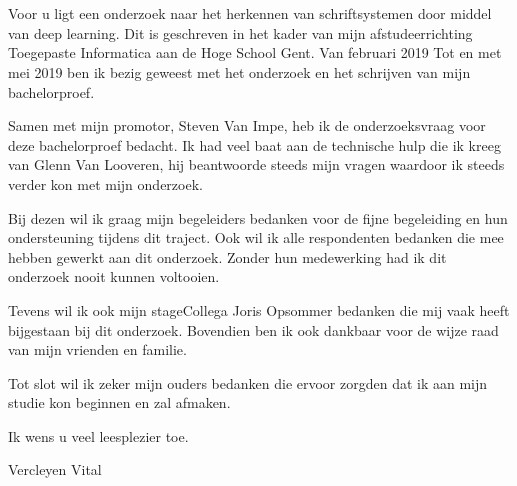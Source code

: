 
\chapter*{}
\label{ch:voorwoord}


Voor u ligt een onderzoek naar het herkennen van schriftsystemen door middel van deep learning.
Dit is geschreven in het kader van mijn afstudeerrichting Toegepaste Informatica aan de Hoge School Gent.
Van februari 2019 Tot en met mei 2019 ben ik bezig geweest met het onderzoek en het schrijven van mijn bachelorproef.

Samen met mijn promotor, Steven Van Impe, heb ik de onderzoeksvraag voor deze bachelorproef bedacht.
Ik had veel baat aan de technische hulp die ik kreeg van Glenn Van Looveren, hij beantwoorde steeds mijn vragen waardoor ik steeds verder kon met mijn onderzoek.

Bij dezen wil ik graag mijn begeleiders bedanken voor de fijne begeleiding en hun ondersteuning tijdens dit traject. Ook wil ik alle respondenten bedanken die mee hebben gewerkt aan dit onderzoek. Zonder hun medewerking had ik dit onderzoek nooit kunnen voltooien.

Tevens wil ik ook mijn stageCollega Joris Opsommer bedanken die mij vaak heeft bijgestaan bij dit onderzoek.
Bovendien ben ik ook dankbaar voor de wijze raad van mijn vrienden en familie.

Tot slot wil ik zeker mijn ouders bedanken die ervoor zorgden dat ik aan mijn studie kon beginnen en zal afmaken.

Ik wens u veel leesplezier toe.

Vercleyen Vital

